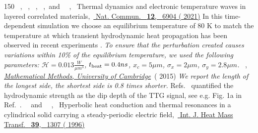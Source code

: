 \documentclass[
prb,
twocolumn,
superscriptaddress,
 amsmath,amssymb,
 aps,
longbibliography,
]{revtex4-2}
\begin{document}
\begin{thebibliography}{150}
  \BibitemOpen
   { {~},  {~},  {~},  {~},\ and\  {~},\ } { {Thermal dynamics and electronic temperature waves in layered correlated materials},\ }\href {https://www.nature.com/articles/s41467-021-27081-2} { { {Nat. Commun.}\ }\textbf { {12}},\  {6904} ( {2021})}
  \BibitemOpen
   {In this time-dependent simulation we choose an equilibrium temperature of 80 K to match the temperature at which transient hydrodynamic heat propagation has been observed in recent experiments \cite {Huberman2019,Jeong2021}.}
  \BibitemOpen
  \href@noop {} {\emph { {{\normalfont To ensure that the perturbation created causes variations within 10\% of the equilibrium temperature, we used the following parameters: $\mathcal{H}=0.013\tfrac{W}{\mu m^3}$, $t_{\rm heat}=0.4ns$, $x_c=5 \mu m$, $\sigma_x=2\mu m$, $\sigma_y=2.8\mu m$.}}}}
  \BibitemOpen
   { {~},\ }\href {https://www.damtp.cam.ac.uk/user/dbs26/1Bmethods.html} {\emph { {{Mathematical Methods, University of Cambridge}}}}\ ( {2015})
  \BibitemOpen
  \href@noop {} {\emph { {{\normalfont We report the length of the longest side, the shortest side is 0.8 times shorter.}}}}
  \BibitemOpen
  \href@noop {} {} {{\normalfont Refs.~\cite{Huberman2019,Ding2022} quantified the hydrodynamic strength as the dip depth of the TTG signal, see e.g. Fig. 1a in Ref.~\cite{Ding2022}.}}
  \BibitemOpen
   { {~}\ and\  {~},\ } { {Hyperbolic heat conduction and thermal resonances in a cylindrical solid carrying a steady-periodic electric field},\ }\href {https://www.sciencedirect.com/science/article/pii/0017931095002022} { { {Int. J. Heat Mass Transf.}\ }\textbf { {39}},\  {1307} ( {1996})}

\end{thebibliography}
\end{document}

